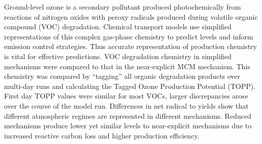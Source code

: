 Ground-level ozone is a secondary pollutant produced photochemically from reactions of nitrogen oxides with peroxy radicals produced during volatile organic compound (VOC) degradation. 
Chemical transport models use simplified representations of this complex gas-phase chemistry to predict  levels and inform emission control strategies. 
Thus accurate representation of  production chemistry is vital for effective predictions.
VOC degradation chemistry in simplified mechanisms were compared to that in the near-explicit MCM mechanism. 
This chemistry was compared by ``tagging'' all organic degradation products over multi-day runs and calculating the Tagged Ozone Production Potential (TOPP). 
First day TOPP values were similar for most VOCs, larger discrepancies arose over the course of the model run. 
Differences in net radical to  yields show that different atmospheric regimes are represented in different mechanisms.
Reduced mechanisms produce lower yet similar  levels to near-explicit mechanisms due to increased reactive carbon loss and higher  production efficiency.
